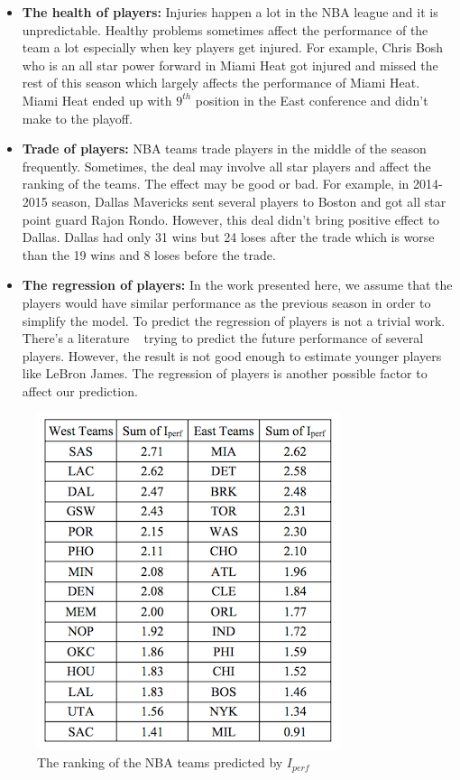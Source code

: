 \documentclass{acm_proc_article-sp}
\begin{document}
\begin{itemize}
\item \textbf{The health of players:} Injuries happen a lot in the NBA league and it is unpredictable. Healthy problems sometimes affect the performance of the team a lot especially when key players get injured. For example, Chris Bosh who is an all star power forward in Miami Heat got injured and missed the rest of this season which largely affects the performance of Miami Heat. Miami Heat ended up with $9^{th}$ position in the East conference and didn't make to the playoff.
\item \textbf{Trade of players:} NBA teams trade players in the middle of the season frequently. Sometimes, the deal may involve all star players and affect the ranking of the teams. The effect may be good or bad. For example, in 2014-2015 season, Dallas Mavericks sent several players to Boston and got all star point guard Rajon Rondo. However, this deal didn't bring positive effect to Dallas. Dallas had only 31 wins but 24 loses after the trade which is worse than the 19 wins and 8 loses before the trade. 
\item \textbf{The regression of players:} In the work presented here, we assume that the players would have similar performance as the previous season in order to simplify the model. To predict the regression of players is not a trivial work. There's a literature     ~\cite{H} trying to predict the future performance of several players. However, the result is not good enough to estimate younger players like LeBron James. The regression of players is another possible factor to affect our prediction. 
\end{itemize}

\begin{figure}[!htb]
\centering
\includegraphics{Fig-12.png}
\caption{The ranking of the NBA teams predicted by $I_{perf}$}
\end{figure}
\end{document}
